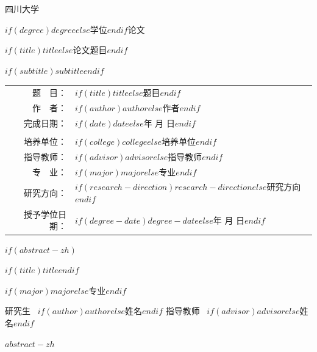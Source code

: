 \documentclass[UTF8,zihao=-4,linespread=1.0,twoside,scheme=chinese]{ctexbook}
\newcommand{\kaiti}{\CJKfamily{zhkai}}
\begin{document}
\begin{titlepage}
\centering
\vspace*{1.6cm}
{\heiti{} 四川大学 \par}
\vspace{1.0cm}
{\heiti{} $if(degree)$$degree$$else$学位$endif$论文 \par}
\vfill
{\heiti{} $if(title)$$title$$else$论文题目$endif$ \par}
\vspace{0.5cm}
{\songti{} $if(subtitle)$$subtitle$$endif$ \par}
\vfill
{\songti{}
\begin{tabular}{rl}
题\ \ 目： & $if(title)$$title$$else$题目$endif$ \\
作\ \ 者： & $if(author)$$author$$else$作者$endif$ \\
完成日期： & $if(date)$$date$$else$\qquad 年 \qquad 月 \qquad 日$endif$ \\
\\
培养单位： & $if(college)$$college$$else$培养单位$endif$ \\
指导教师： & $if(advisor)$$advisor$$else$指导教师$endif$ \\
专\ \ 业： & $if(major)$$major$$else$专业$endif$ \\
研究方向： & $if(research-direction)$$research-direction$$else$研究方向$endif$ \\
授予学位日期： & $if(degree-date)$$degree-date$$else$\qquad 年 \qquad 月 \qquad 日$endif$ \\
\end{tabular}
\par}
\end{titlepage}

\frontmatter
\pagestyle{plain}

$if(abstract-zh)$
\cleardoublepage
\vspace*{40pt}
\begin{center}
{\songti{} $if(title)$$title$$endif$ \par}
\vspace{20pt}
{\songti{} $if(major)$$major$$else$专业$endif$ \par}
\vspace{20pt}
{\heiti{} 研究生 \ \kaiti $if(author)$$author$$else$姓名$endif$ \quad
 指导教师 \ \kaiti $if(advisor)$$advisor$$else$姓名$endif$ \par}
\end{center}
\vspace{40pt}
$abstract-zh$
\end{document}
